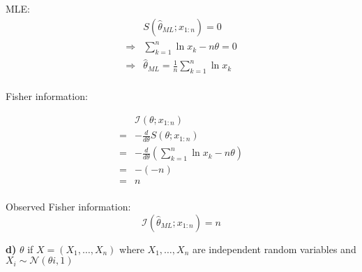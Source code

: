 \documentclass{article}
\begin{document}
\begin{ssolution}
MLE:
\begin{align*}
	& S(\hat{\theta}_{ML};x_{1:n}) = 0 \\
	\Rightarrow& \sum_{k=1}^n\ln{x_k}-n\theta = 0 \\
	\Rightarrow& \hat{\theta}_{ML} = \frac{1}{n}\sum_{k=1}^n\ln{x_k} \\
\end{align*}

Fisher information:

\begin{align*}
	& \mathcal{I}(\theta;x_{1:n}) \\
	=& -\frac{d}{d\theta} S(\theta;x_{1:n}) \\
	=& -\frac{d}{d\theta} \left(\sum_{k=1}^n \ln x_k - n\theta\right) \\
	=& - \left(- n\right) \\
	=& n \\
\end{align*}

Observed Fisher information:
\[\mathcal{I}(\hat{\theta}_{ML};x_{1:n}) = n\]
\end{ssolution}

\begin{ssubproblem}
\textbf{d)}
\(\theta\) if \(X = (X_1,\ldots,X_n)\) where \(X_1,\ldots,X_n\)
are independent random variables and \(X_i \sim
\mathcal{N}(\theta i,1)\)
\end{ssubproblem}
\end{document}
